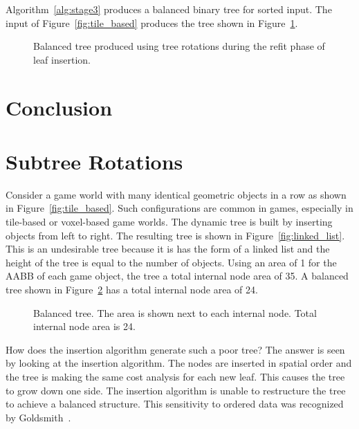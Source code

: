 \documentclass{article}
\begin{document}
Algorithm~\ref{alg:stage3} produces a balanced binary tree for sorted input. The input of Figure~\ref{fig:tile_based} produces the tree shown in Figure~\ref{fig:sort_balanced}.

\begin{figure}
	\begin{center}
		
	\end{center}
	\caption{Balanced tree produced using tree rotations during the refit phase of leaf insertion.}
	\label{fig:sort_balanced}
\end{figure}

\section{Conclusion}

\section{Subtree Rotations}

Consider a game world with many identical geometric objects in a row as shown in Figure~\ref{fig:tile_based}. Such configurations are common in games, especially in tile-based or voxel-based game worlds. The dynamic tree is built by inserting objects from left to right. The resulting tree is shown in Figure~\ref{fig:linked_list}. This is an undesirable tree because it is has the form of a linked list and the height of the tree is equal to the number of objects. Using an area of 1 for the AABB of each game object, the tree a total internal node area of 35. A balanced tree shown in Figure~\ref{fig:balanced} has a total internal node area of 24.

\begin{figure}
	\begin{center}
		
	\end{center}
	\caption{Balanced tree. The area is shown next to each internal node. Total internal node area is 24. }
	\label{fig:balanced}
\end{figure}

How does the insertion algorithm generate such a poor tree? The answer is seen by looking at the insertion algorithm. The nodes are inserted in spatial order and the tree is making the same cost analysis for each new leaf. This causes the tree to grow down one side. The insertion algorithm is unable to restructure the tree to achieve a balanced structure. This sensitivity to ordered data was recognized by Goldsmith~\cite{Goldsmith1987}.
\end{document}
